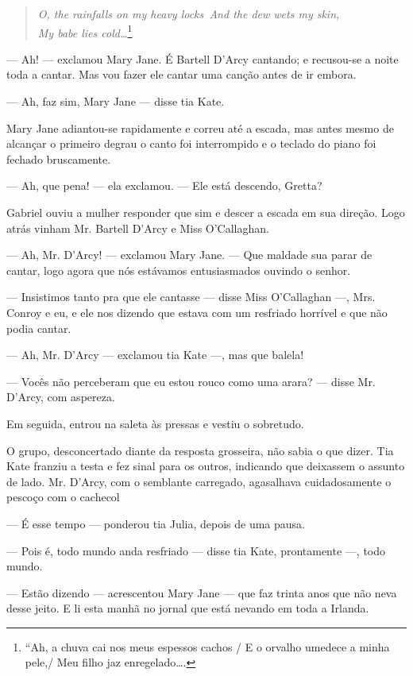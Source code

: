\begin{verse}{\itshape
O, the rainfalls on my heavy locks\
And the dew wets my skin,\\
My babe lies cold\ldots{}}\footnote{ ``Ah, a chuva cai nos meus espessos cachos / E o orvalho
umedece a minha pele,/ Meu filho jaz enregelado\ldots{}.}
\end{verse}

--- Ah! --- exclamou Mary Jane. É Bartell D'Arcy cantando; e
recusou-se a noite toda a cantar. Mas vou fazer ele cantar uma canção
antes de ir embora.

--- Ah, faz sim, Mary Jane --- disse tia Kate.

Mary Jane adiantou-se rapidamente e correu até a escada, mas antes
mesmo de alcançar o primeiro degrau o canto foi interrompido e o
teclado do piano foi fechado bruscamente.

--- Ah, que pena! --- ela exclamou. --- Ele está descendo, Gretta?

Gabriel ouviu a mulher responder que sim e descer a escada em sua
direção. Logo atrás vinham Mr. Bartell D'Arcy e Miss O'Callaghan.

--- Ah, Mr. D'Arcy! --- exclamou Mary Jane. --- Que maldade sua parar 
de cantar, logo agora que nós estávamos entusiasmados ouvindo o
senhor.

--- Insistimos tanto pra que ele cantasse --- disse Miss O'Callaghan
---, Mrs. Conroy e eu, e ele nos dizendo que estava com um resfriado
horrível e que não podia cantar.

--- Ah, Mr. D'Arcy --- exclamou tia Kate ---, mas que balela!

--- Vocês não perceberam que eu estou rouco como uma arara? ---
disse Mr. D'Arcy, com aspereza.

Em seguida, entrou na saleta às pressas e vestiu o sobretudo.

O grupo, desconcertado diante da resposta grosseira, não sabia o
que dizer. Tia Kate franziu a testa e fez sinal para os outros,
indicando que deixassem o assunto de lado. Mr. D'Arcy, com o
semblante carregado, agasalhava cuidadosamente o pescoço com
o cachecol

--- É esse tempo --- ponderou tia Julia, depois de uma pausa.

--- Pois é, todo mundo anda resfriado --- disse tia Kate,
prontamente ---, todo mundo.

--- Estão dizendo --- acrescentou Mary Jane --- que faz trinta anos
que não neva desse jeito. E li esta manhã no jornal que está nevando
em toda a Irlanda.

